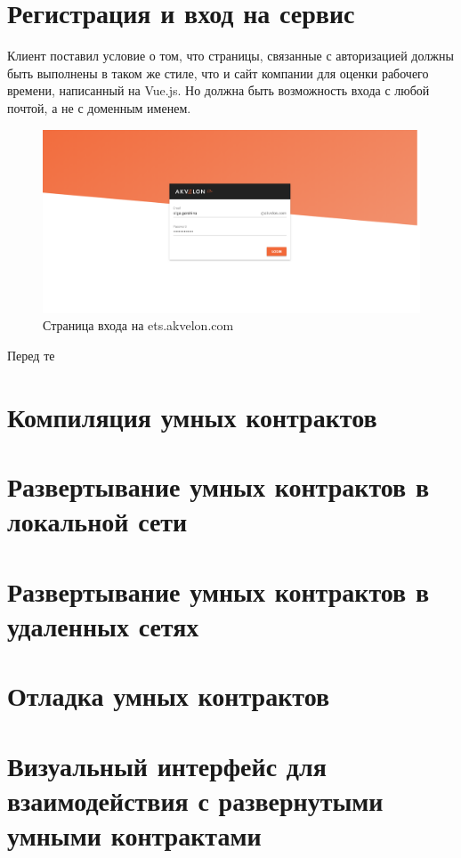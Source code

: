 \documentclass[a4paper,12pt]{diplom}
\begin{document}
\section{Регистрация и вход на сервис}

Клиент поставил условие о том, что страницы, связанные с авторизацией должны быть выполнены в таком же стиле, что и сайт компании для
оценки рабочего времени, написанный на Vue.js. Но должна быть возможность входа с любой почтой, а не с доменным именем.

\begin{figure}[!ht]
	\centering
	\includegraphics[width=1\textwidth]{resources/ets.png}
	\caption{Страница входа на ets.akvelon.com}
	\label{fig:1}
\end{figure}

Перед те

\section{Компиляция умных контрактов}

\section{Развертывание умных контрактов в локальной сети}

\section{Развертывание умных контрактов в удаленных сетях}

\section{Отладка умных контрактов}

\section{Визуальный интерфейс для взаимодействия с развернутыми умными контрактами}
\end{document}

